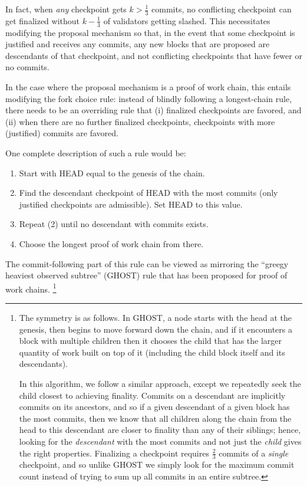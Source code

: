 \documentclass[12pt, final]{article}
\begin{document}
In fact, when \textit{any} checkpoint gets $k > \frac{1}{3}$ commits, no conflicting checkpoint can get finalized without $k - \frac{1}{3}$ of validators getting slashed. This necessitates modifying the proposal mechanism so that, in the event that some checkpoint is justified and receives any commits, any new blocks that are proposed are descendants of that checkpoint, and not conflicting checkpoints that have fewer or no commits.

In the case where the proposal mechanism is a proof of work chain, this entails modifying the fork choice rule: instead of blindly following a longest-chain rule, there needs to be an overriding rule that (i) finalized checkpoints are favored, and (ii) when there are no further finalized checkpoints, checkpoints with more (justified) commits are favored.

One complete description of such a rule would be:

\begin{enumerate}
\item Start with HEAD equal to the genesis of the chain.
\item Find the descendant checkpoint of HEAD with the most commits (only justified checkpoints are admissible). Set HEAD to this value.
\item Repeat (2) until no descendant with commits exists.
\item Choose the longest proof of work chain from there.
\end{enumerate}

The commit-following part of this rule can be viewed as mirroring the ``greegy heaviest observed subtree'' (GHOST) rule that has been proposed for proof of work chains\cite{sompolinsky2013accelerating}. \footnote{The symmetry is as follows. In GHOST, a node starts with the head at the genesis, then begins to move forward down the chain, and if it encounters a block with multiple children then it chooses the child that has the larger quantity of work built on top of it (including the child block itself and its descendants).

In this algorithm, we follow a similar approach, except we repeatedly seek the child closest to achieving finality. Commits on a descendant are implicitly commits on its ancestors, and so if a given descendant of a given block has the most commits, then we know that all children along the chain from the head to this descendant are closer to finality than any of their siblings; hence, looking for the \textit{descendant} with the most commits and not just the \textit{child} gives the right properties. Finalizing a checkpoint requires $\frac{2}{3}$ commits of a \textit{single} checkpoint, and so unlike GHOST we simply look for the maximum commit count instead of trying to sum up all commits in an entire subtree.}
\end{document}
